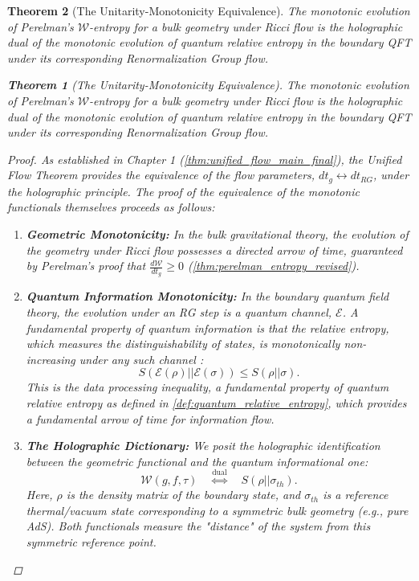 \documentclass[11pt, letterpaper]{report}
\theoremstyle{plain} %
\newtheorem{theorem}{Theorem}[chapter]
\theoremstyle{definition} %
\theoremstyle{remark} %
\begin{document}
\begin{theorem}[The Unitarity-Monotonicity Equivalence]
\label{thm:unitarity_monotonicity_final}
The monotonic evolution of Perelman's $\mathcal{W}$-entropy for a bulk geometry under Ricci flow is the holographic dual of the monotonic evolution of quantum relative entropy in the boundary QFT under its corresponding Renormalization Group flow.
\begin{theorem}[The Unitarity-Monotonicity Equivalence]
\label{thm:unitarity_monotonicity_final}
The monotonic evolution of Perelman's $\mathcal{W}$-entropy for a bulk geometry under Ricci flow is the holographic dual of the monotonic evolution of quantum relative entropy in the boundary QFT under its corresponding Renormalization Group flow.
\end{theorem}
\begin{proof}
As established in Chapter 1 (\cref{thm:unified_flow_main_final}), the Unified Flow Theorem provides the equivalence of the flow parameters, $dt_g \leftrightarrow dt_{RG}$, under the holographic principle. The proof of the equivalence of the monotonic functionals themselves proceeds as follows:
\begin{enumerate}
    \item \textbf{Geometric Monotonicity:} In the bulk gravitational theory, the evolution of the geometry under Ricci flow possesses a directed arrow of time, guaranteed by Perelman's proof that $\frac{d\mathcal{W}}{dt_g} \ge 0$ (\cref{thm:perelman_entropy_revised}).

    \item \textbf{Quantum Information Monotonicity:} In the boundary quantum field theory, the evolution under an RG step is a quantum channel, $\mathcal{E}$. A fundamental property of quantum information is that the relative entropy, which measures the distinguishability of states, is monotonically non-increasing under any such channel \cite{Wehrl1978,NielsenChuang2010}:
    \begin{equation}
        S(\mathcal{E}(\rho) || \mathcal{E}(\sigma)) \le S(\rho || \sigma).
        \label{eq:relative_entropy_monotonicity_final}
    \end{equation}
    This is the data processing inequality, a fundamental property of quantum relative entropy as defined in \cref{def:quantum_relative_entropy}, which provides a fundamental arrow of time for information flow.

    \item \textbf{The Holographic Dictionary:} We posit the holographic identification between the geometric functional and the quantum informational one:
    \begin{equation}
        \mathcal{W}(g, f, \tau) \quad \overset{\text{dual}}{\Longleftrightarrow} \quad S(\rho || \sigma_{th}).
    \end{equation}
    Here, $\rho$ is the density matrix of the boundary state, and $\sigma_{th}$ is a reference thermal/vacuum state corresponding to a symmetric bulk geometry (e.g., pure AdS). Both functionals measure the "distance" of the system from this symmetric reference point.


\end{enumerate}
\end{proof}
\end{theorem}
\end{document}
